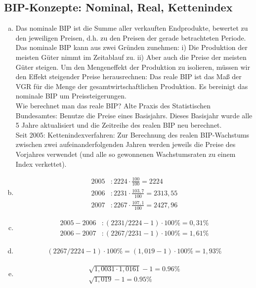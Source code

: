 \documentclass{scrartcl}
\begin{document}
\subsection{BIP-Konzepte: Nominal, Real, Kettenindex}
\begin{enumerate}[a)]
\item Das nominale BIP ist die Summe aller verkauften Endprodukte, bewertet zu den jeweiligen Preisen, d.h. zu den Preisen der gerade
betrachteten Periode. Das nominale BIP kann aus zwei Gr\"{u}nden zunehmen: i) Die Produktion der meisten G\"{u}ter nimmt im Zeitablauf zu. ii) Aber auch die Preise der meisten G\"{u}ter steigen.
Um den Mengeneffekt der Produktion zu isolieren, m\"{u}ssen wir den Effekt steigender Preise herausrechnen: Das reale BIP ist das Ma{\ss} der VGR f\"{u}r die Menge der gesamtwirtschaftlichen
Produktion. Es bereinigt das nominale BIP um Preissteigerungen.\\
Wie berechnet man das reale BIP?
Alte Praxis des Statistischen Bundesamtes: Benutze die Preise eines Basisjahrs. Dieses Basisjahr wurde alle 5 Jahre aktualisiert und die
Zeitreihe des realen BIP neu berechnet.\\
Seit 2005: Kettenindexverfahren: Zur Berechnung des realen BIP-Wachstums zwischen zwei aufeinanderfolgenden Jahren werden jeweils die Preise des Vorjahres verwendet (und alle so gewonnenen Wachstumsraten zu
einem Index verkettet).
  \item \begin{align*}
  2005&: 2224 \cdot \frac{100}{100} = 2224\\
  2006&: 2231 \cdot \frac{103,7}{100} = 2313,55\\
  2007&: 2267 \cdot \frac{107,1}{100} = 2427,96
  \end{align*}
  \item \begin{align*}
    2005-2006&: (2231/2224-1)\cdot 100\% = 0,31 \%\\
    2006-2007&: (2267/2231-1)\cdot 100\% = 1,61 \%
  \end{align*}
  \item \begin{align*}
    (2267/2224-1)\cdot 100\% = (1,019 -1)\cdot 100\% = 1,93 \%
  \end{align*}
  \item \begin{align*}
    \sqrt{1,0031\cdot1,0161} -1 = 0.96\%\\
    \sqrt{1,019}-1 = 0.95\%
  \end{align*}
\end{enumerate}
\end{document}

